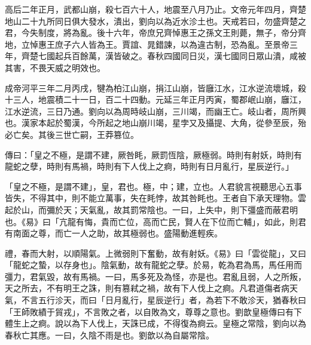 \begin{pinyinscope}
高后二年正月，武都山崩，殺七百六十人，地震至八月乃止。文帝元年四月，齊楚地山二十九所同日俱大發水，潰出，劉向以為近水沴土也。天戒若曰，勿盛齊楚之君，今失制度，將為亂。後十六年，帝庶兄齊悼惠王之孫文王則薨，無子，帝分齊地，立悼惠王庶子六人皆為王。賈誼、晁錯諫，以為違古制，恐為亂。至景帝三年，齊楚七國起兵百餘萬，漢皆破之。春秋四國同日災，漢七國同日眾山潰，咸被其害，不畏天威之明效也。

成帝河平三年二月丙戌，犍為柏江山崩，捐江山崩，皆廱江水，江水逆流壞城，殺十三人，地震積二十一日，百二十四動。元延三年正月丙寅，蜀郡岷山崩，廱江，江水逆流，三日乃通。劉向以為周時岐山崩，三川竭，而幽王亡。岐山者，周所興也。漢家本起於蜀漢，今所起之地山崩川竭，星孛又及攝提、大角，從參至辰，殆必亡矣。其後三世亡嗣，王莽篡位。

傳曰：「皇之不極，是謂不建，厥咎眊，厥罰恆陰，厥極弱。時則有射妖，時則有龍蛇之孽，時則有馬禍，時則有下人伐上之痾，時則有日月亂行，星辰逆行。」

「皇之不極，是謂不建」，皇，君也。極，中；建，立也。人君貌言視聽思心五事皆失，不得其中，則不能立萬事，失在眊悖，故其咎眊也。王者自下承天理物。雲起於山，而彌於天；天氣亂，故其罰常陰也。一曰，上失中，則下彊盛而蔽君明也。《易》曰「亢龍有悔，貴而亡位，高而亡民，賢人在下位而亡輔」，如此，則君有南面之尊，而亡一人之助，故其極弱也。盛陽動進輕疾。

禮，春而大射，以順陽氣。上微弱則下奮動，故有射妖。《易》曰「雲從龍」，又曰「龍蛇之蟄，以存身也」。陰氣動，故有龍蛇之孽。於易，乾為君為馬，馬任用而彊力，君氣毀，故有馬禍。一曰，馬多死及為怪，亦是也。君亂且弱，人之所叛，天之所去，不有明王之誅，則有篡弒之禍，故有下人伐上之痾。凡君道傷者病天氣，不言五行沴天，而曰「日月亂行，星辰逆行」者，為若下不敢沴天，猶春秋曰「王師敗績于貿戎」，不言敗之者，以自敗為文，尊尊之意也。劉歆皇極傳曰有下體生上之痾。說以為下人伐上，天誅已成，不得復為痾云。皇極之常陰，劉向以為春秋亡其應。一曰，久陰不雨是也。劉歆以為自屬常陰。


\end{pinyinscope}
